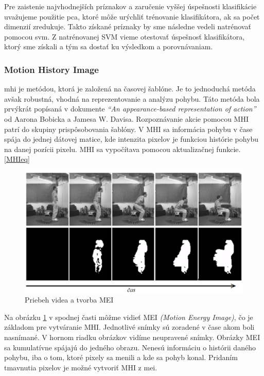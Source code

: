 Pre zaistenie najvhodnejších príznakov a zaručenie vyššej úspešnosti klasifikácie uvažujeme použitie \acrfull{pca}, ktoré môže urýchliť trénovanie klasifikátora, ak sa počet dimenzií zredukuje. Takto získané príznaky by sme následne vedeli natrénovať pomocou \acrfull{svm}. Z natrénovanej SVM vieme otestovať úspešnosť klasifikátora, ktorý sme získali a tým sa dostať ku výsledkom a porovnávaniam. 

\subsubsection{Motion History Image} \label{MHIlabel}
\acrshort{mhi} je metódou, ktorá je založená na časovej šablóne. Je to jednoduchá metóda avšak robustná, vhodná na reprezentovanie a analýzu pohybu.\cite{c3}  Táto metóda bola prvýkrát popísaná v dokumente \textit{``An appearance-based representation of action''} od Aarona Bobicka a Jamesa W. Davisa.\cite{c2} Rozpoznávanie akcie pomocou MHI patrí do skupiny prispôsobovania šablóny. V MHI sa informácia pohybu v čase spája do jednej dátovej matice, kde intenzita pixelov je funkciou histórie pohybu na danej pozícii pixelu. MHI sa vypočítava pomocou aktualizačnej funkcie.\ref{MHIeq}

\begin{figure}[H]
  \centering
  \includegraphics[width=16cm]{img/MHIudacity.png}
  \caption{Priebeh videa a tvorba MEI \cite{c22}}
  \label{MHIuda}
\end{figure}

Na obrázku \ref{MHIuda} v spodnej časti môžme vidieť MEI \textit{(Motion Energy Image)}, čo je základom pre vytváranie MHI. Jednotlivé snímky sú zoradené v čase akom boli nasnímané. V hornom riadku obrázkov vidíme neupravené snímky. Obrázky MEI sa kumulatívne spájajú do jedného obrazu. Nenesú informáciu o histórii daného pohybu, iba o tom, ktoré pixely sa menili a kde sa pohyb konal. Pridaním tmavnutia pixelov je možné vytvoriť MHI z \acrshort{mei}.

